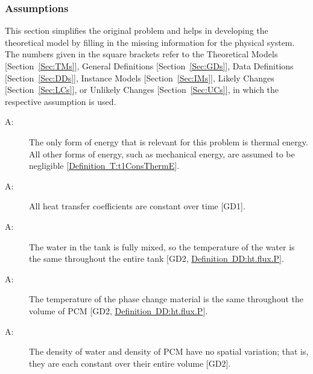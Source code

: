 \documentclass[12pt]{article}
\newcounter{assumpnum}
\newcommand{\atheassumpnum}{A\theassumpnum}
\begin{document}
\subsubsection{Assumptions}
\label{Sec:Assumps}
This section simplifies the original problem and helps in developing the theoretical model by filling in the missing information for the physical system. The numbers given in the square brackets refer to the Theoretical Models {[}Section~\ref{Sec:TMs}{]}, General Definitions {[}Section~\ref{Sec:GDs}{]}, Data Definitions {[}Section~\ref{Sec:DDs}{]}, Instance Models {[}Section~\ref{Sec:IMs}{]}, Likely Changes {[}Section~\ref{Sec:LCs}{]}, or Unlikely Changes {[}Section~\ref{Sec:UCs}{]}, in which the respective assumption is used.
\begin{description}
\item[\atheassumpnum\label{A:Thermal-Energy-Only}:]The only form of energy that is relevant for this problem is thermal energy. All other forms of energy, such as mechanical energy, are assumed to be negligible {[}\hyperref[T:t1ConsThermE]{Definition~T:t1ConsThermE}{]}.
\end{description}
\begin{description}
\item[\atheassumpnum\label{A:Heat-Transfer-Coeffs-Constant}:]All heat transfer coefficients are constant over time {[}GD1{]}.
\end{description}
\begin{description}
\item[\atheassumpnum\label{A:Constant-Water-Temp-Across-Tank}:]The water in the tank is fully mixed, so the temperature of the water is the same throughout the entire tank {[}GD2, \hyperref[DD:ht.flux.P]{Definition~DD:ht.flux.P}{]}.
\end{description}
\begin{description}
\item[\atheassumpnum\label{A:Temp-PCM-Constant-Across-Volume}:]The temperature of the phase change material is the same throughout the volume of PCM {[}GD2, \hyperref[DD:ht.flux.P]{Definition~DD:ht.flux.P}{]}.
\end{description}
\begin{description}
\item[\atheassumpnum\label{A:Density-Water-PCM-Constant-over-Volume}:]The density of water and density of PCM have no spatial variation; that is, they are each constant over their entire volume {[}GD2{]}.
\end{description}
\end{document}
